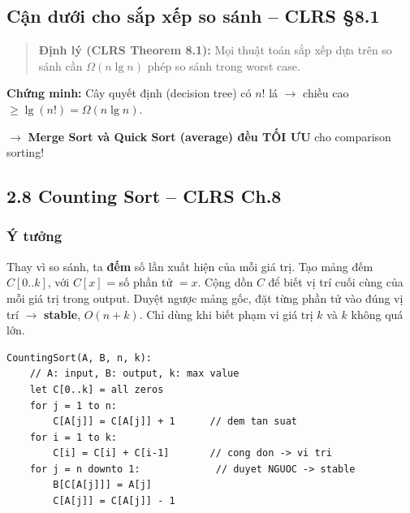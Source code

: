 \documentclass[10pt]{article}
\begin{document}
\subsection{\texorpdfstring{Cận dưới cho sắp xếp so sánh -- CLRS
\S 8.1}{Cận dưới cho sắp xếp so sánh -- CLRS 8.1}}\label{cux1eadn-dux1b0ux1edbi-cho-sux1eafp-xux1ebfp-so-suxe1nh-clrs-8.1}

\begin{quote}
\textbf{Định lý (CLRS Theorem 8.1):} Mọi thuật toán sắp xếp dựa trên so
sánh cần \(\Omega(n \lg n)\) phép so sánh trong worst case.
\end{quote}

\textbf{Chứng minh:} Cây quyết định (decision tree) có \(n!\) lá \(\to\)
chiều cao \(\geq \lg(n!) = \Omega(n \lg n)\).

\(\to\) \textbf{Merge Sort và Quick Sort (average) đều TỐI ƯU} cho
comparison sorting!

\subsection{2.8 Counting Sort -- CLRS Ch.8}\label{counting-sort}

\subsubsection{Ý tưởng}
Thay vì so sánh, ta \textbf{đếm} số lần xuất hiện của mỗi giá trị. Tạo mảng đếm $C[0..k]$, với $C[x]$ = số phần tử $= x$. Cộng dồn $C$ để biết vị trí cuối cùng của mỗi giá trị trong output. Duyệt ngược mảng gốc, đặt từng phần tử vào đúng vị trí $\to$ \textbf{stable}, $O(n+k)$. Chỉ dùng khi biết phạm vi giá trị $k$ và $k$ không quá lớn.

\begin{tcolorbox}[colback=gray!8, colframe=gray!50, boxrule=0.5pt, arc=2pt,
  left=6pt, right=6pt, top=4pt, bottom=4pt,
  title={\small\textbf{Pseudocode 9: Counting Sort (CLRS 8.2)}}]
\begin{verbatim}
CountingSort(A, B, n, k):
    // A: input, B: output, k: max value
    let C[0..k] = all zeros
    for j = 1 to n:
        C[A[j]] = C[A[j]] + 1      // dem tan suat
    for i = 1 to k:
        C[i] = C[i] + C[i-1]       // cong don -> vi tri
    for j = n downto 1:             // duyet NGUOC -> stable
        B[C[A[j]]] = A[j]
        C[A[j]] = C[A[j]] - 1
\end{verbatim}
\end{tcolorbox}
\end{document}

